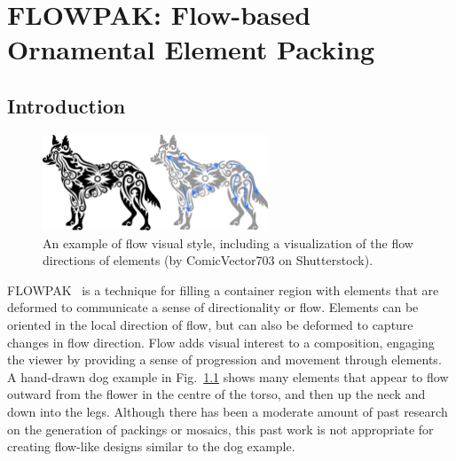 \chapter{FLOWPAK: Flow-based Ornamental Element Packing}



\section{Introduction}

\begin{figure}[ht] %
\centering
\includegraphics[width=0.6\textwidth]{figures/flowpak/dog_ornament_flow.pdf}
\vspace*{-8pt}
\caption{
  \label{dog_flow}
  An example of flow visual style, 
  including a visualization of the flow directions
of elements (by ComicVector703 on Shutterstock).
}
\end{figure}

FLOWPAK~\cite{Saputra2017} is a technique for filling a container 
region with elements that are deformed 
to communicate a sense of directionality or flow.
Elements can be oriented in the local direction 
of flow, but can also be deformed to capture changes in flow direction.
Flow adds visual interest to a composition,
engaging the viewer by providing a sense of progression and
movement through elements.
A hand-drawn dog example in Fig.~\ref{dog_flow} shows many elements that appear to flow
outward from the flower in the centre of the torso, and then
up the neck and down into the legs.
Although there has been a moderate amount of past research on
the generation of packings or mosaics,
this past work is not appropriate for creating flow-like
designs similar to the dog example.


